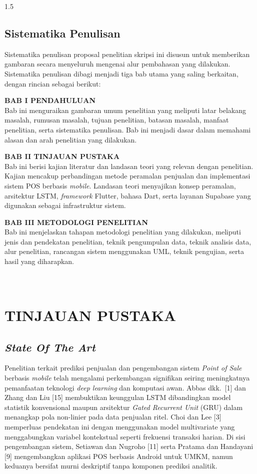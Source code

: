 \documentclass[12pt, a4paper, onecolumn, oneside]{report}
\begin{document}
\begin{spacing}{1.5}
\section{Sistematika Penulisan}
Sistematika penulisan proposal penelitian skripsi ini disusun untuk memberikan gambaran secara menyeluruh mengenai alur pembahasan yang dilakukan. Sistematika penulisan dibagi menjadi tiga bab utama yang saling berkaitan, dengan rincian sebagai berikut:

\noindent\textbf{BAB I PENDAHULUAN}\\
Bab ini menguraikan gambaran umum penelitian yang meliputi latar belakang masalah, rumusan masalah, tujuan penelitian, batasan masalah, manfaat penelitian, serta sistematika penulisan. Bab ini menjadi dasar dalam memahami alasan dan arah penelitian yang dilakukan.

\noindent\textbf{BAB II TINJAUAN PUSTAKA}\\
Bab ini berisi kajian literatur dan landasan teori yang relevan dengan penelitian. Kajian mencakup perbandingan metode peramalan penjualan dan implementasi sistem POS berbasis \textit{mobile}. Landasan teori menyajikan konsep peramalan, arsitektur LSTM, \textit{framework} Flutter, bahasa Dart, serta layanan Supabase yang digunakan sebagai infrastruktur sistem.

\noindent\textbf{BAB III METODOLOGI PENELITIAN}\\
Bab ini menjelaskan tahapan metodologi penelitian yang dilakukan, meliputi jenis dan pendekatan penelitian, teknik pengumpulan data, teknik analisis data, alur penelitian, rancangan sistem menggunakan UML, teknik pengujian, serta hasil yang diharapkan.

\chapter[TINJAUAN PUSTAKA]{\\ TINJAUAN PUSTAKA}

\section{\textit{State Of The Art}}

Penelitian terkait prediksi penjualan dan pengembangan sistem \textit{Point of Sale} berbasis \textit{mobile} telah mengalami perkembangan signifikan seiring meningkatnya pemanfaatan teknologi \textit{deep learning} dan komputasi awan. Abbas dkk.~[1] dan Zhang dan Liu [15] membuktikan keunggulan LSTM dibandingkan model statistik konvensional maupun arsitektur \textit{Gated Recurrent Unit} (GRU) dalam menangkap pola non-linier pada data penjualan ritel. Choi dan Lee [3] memperluas pendekatan ini dengan menggunakan model multivariate yang menggabungkan variabel kontekstual seperti frekuensi transaksi harian. Di sisi pengembangan sistem, Setiawan dan Nugroho [11] serta Pratama dan Handayani [9] mengembangkan aplikasi POS berbasis Android untuk UMKM, namun keduanya bersifat murni deskriptif tanpa komponen prediksi analitik.


\end{spacing}
\end{document}
